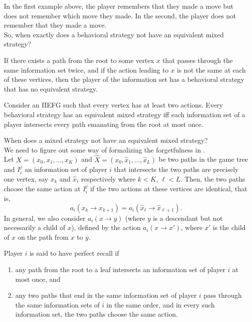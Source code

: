 	In the first example above, the player remembers that they made a move but does not remember which move they made. In the second, the player does not remember that they made a move.\\

	So, when exactly does a behavioral strategy not have an equivalent mixed strategy?

	\begin{flem}
		If there exists a path from the root to some vertex $x$ that passes through the same information set twice, and if the action leading to $x$ is not the same at each of these vertices, then the player of the information set has a behavioral strategy that has no equivalent strategy.
	\end{flem}

	\begin{ftheo}
		\label{theo: behavioral has equivalent mixed}
		Consider an IIEFG such that every vertex has at least two actions. Every behavioral strategy has an equivalent mixed strategy iff each information set of a player intersects every path emanating from the root at most once.
	\end{ftheo}

	When does a mixed strategy not have an equivalent mixed strategy?\\
	We need to figure out some way of formalizing the forgetfulness in .\\
	Let $X = (x_0,x_1,\ldots,x_K)$ and $\hat{X} = (x_0,\hat{x}_1,\ldots,\hat{x}_L)$ be two paths in the game tree and $I_i^j$ an information set of player $i$ that intersects the two paths are precisely one vertex, say $x_k$ and $\hat{x}_\ell$ respectively where $k<K$, $\ell<L$. Then, the two paths choose the same action at $I_i^j$ if the two actions at these vertices are identical, that is,
	\[  a_i(x_k \to x_{k+1}) = a_i(\hat{x}_\ell \to \hat{x}_{\ell+1}). \]
	In general, we also consider $a_i(x \to y)$ (where $y$ is a descendant but not necessarily a child of $x$), defined by the action $a_i(x \to x')$, where $x'$ is the child of $x$ on the path from $x$ to $y$.

	Player $i$ is said to have perfect recall if
	\begin{enumerate}
		\item any path from the root to a leaf intersects an information set of player $i$ at most once, and
		\item any two paths that end in the same information set of player $i$ pass through the same information sets of $i$ in the same order, and in every such information set, the two paths choose the same action.
	\end{enumerate}

